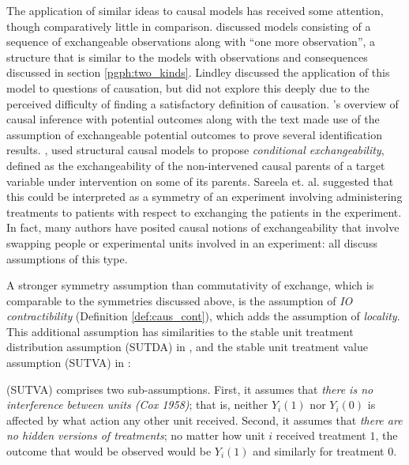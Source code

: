 The application of similar ideas to causal models has received some attention, though comparatively little in comparison. \citet{lindley_role_1981} discussed models consisting of a sequence of exchangeable observations along with ``one more observation'', a structure that is similar to the models with observations and consequences discussed in section \ref{pgph:two_kinds}. Lindley discussed the application of this model to questions of causation, but did not explore this deeply due to the perceived difficulty of finding a satisfactory definition of causation. \citet{rubin_causal_2005}'s overview of causal inference with potential outcomes along with the text \citet{imbens_causal_2015} made use of the assumption of exchangeable potential outcomes to prove several identification results. \citet{saarela_role_2020}, used structural causal models to propose \emph{conditional exchangeability}, defined as the exchangeability of the non-intervened causal parents of a target variable under intervention on some of its parents. Sareela et. al. suggested that this could be interpreted as a symmetry of an experiment involving administering treatments to patients with respect to exchanging the patients in the experiment. In fact, many authors have posited causal notions of exchangeability that involve swapping people or experimental units involved in an experiment: \citet{hernan_estimating_2006,hernan_beyond_2012,greenland_identifiability_1986,banerjee_chapter_2017,dawid_decision-theoretic_2020} all discuss assumptions of this type. 

A stronger symmetry assumption than commutativity of exchange, which is comparable to the symmetries discussed above, is the assumption of \emph{IO contractibility} (Definition \ref{def:caus_cont}), which adds the assumption of \emph{locality}. This additional assumption has similarities to the stable unit treatment distribution assumption (SUTDA) in \citet{dawid_decision-theoretic_2020}, and the stable unit treatment value assumption (SUTVA) in \citep{rubin_causal_2005}:
\begin{blockquote}
(SUTVA) comprises two sub-assumptions. First, it assumes that \emph{there is no interference between units (Cox 1958)}; that is, neither $Y_i(1)$ nor $Y_i(0)$ is affected by what action any other unit received. Second, it assumes that \emph{there are no hidden versions of treatments}; no matter how unit $i$ received treatment $1$, the outcome that would be observed would be $Y_i(1)$ and similarly for treatment $0$.
\end{blockquote}

